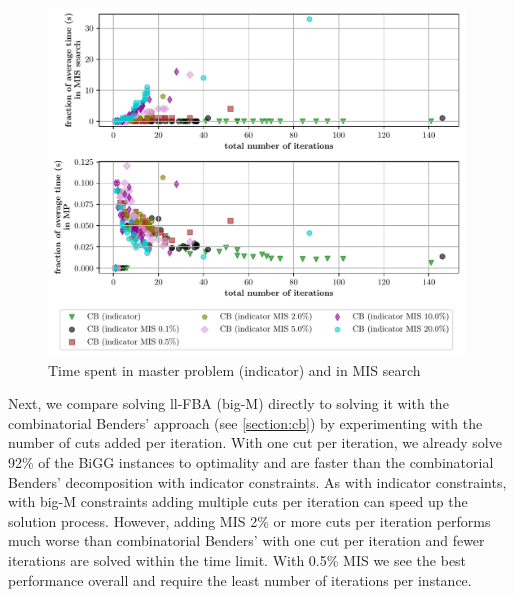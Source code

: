\begin{figure}[h!]
    \centering
    \includegraphics[width=0.983\textwidth]{Images/mis_comparison_time_vs_iterations.pdf}
    \caption{Time spent in master problem (indicator) and in MIS search}
    \label{fig:mis_comparison_time_vs_iterations}
\end{figure}

\clearpage
Next, we compare solving \textsf{ll-FBA (big-M)} directly to solving it with the combinatorial Benders' approach (see \cref{section:cb}) by experimenting with the number of cuts added per iteration. With one cut per iteration, we already solve 92\% of the BiGG instances to optimality and are faster than the combinatorial Benders' decomposition with indicator constraints. As with indicator constraints, with big-M constraints adding multiple cuts per iteration can speed up the solution process. However, adding MIS 2\% or more cuts per iteration performs much worse than combinatorial Benders' with one cut per iteration and fewer iterations are solved within the time limit. With 0.5\% MIS we see the best performance overall and require the least number of iterations per instance.  

